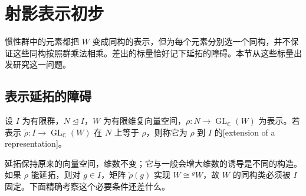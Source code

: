 

\section{射影表示初步}
\label{b5:sec:0404}

惯性群中的元素都把 \(W\) 变成同构的表示，但为每个元素分别选一个同构，并不保证这些同构按照群乘法相乘。差出的标量恰好记下延拓的障碍。本节从这些标量出发研究这一问题。

\subsection{表示延拓的障碍}
\label{b5:subsec:0404:01}

\begin{definition}\label{b5:def:representation-extension}
	设 \(I\) 为有限群，\(N\trianglelefteq I\)，\(W\) 为有限维复向量空间，\(\rho:N\to\operatorname{GL}_{\mathbb C}(W)\) 为表示。若表示 \(\widetilde\rho:I\to\operatorname{GL}_{\mathbb C}(W)\) 在 \(N\) 上等于 \(\rho\)，则称它为 \(\rho\) 到 \(I\) 的[extension of a representation]。
\end{definition}

延拓保持原来的向量空间，维数不变；它与一般会增大维数的诱导是不同的构造。如果 \(\rho\) 能延拓，则对 \(g\in I\)，矩阵 \(\widetilde\rho(g)\) 实现 \(W\cong{}^gW\)，故 \(W\) 的同构类必须被 \(I\) 固定。下面精确考察这个必要条件还差什么。

